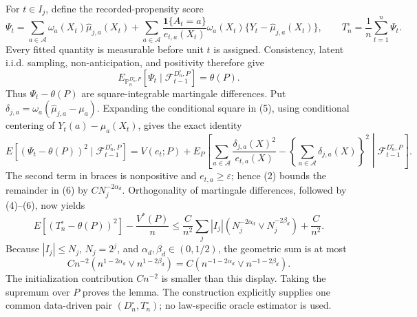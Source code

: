 For \(t\in I_j\), define the recorded-propensity score
\[
\Psi_t=
\sum_{a\in\mathcal A}\omega_a(X_t)\widehat\mu_{j,a}(X_t)
+\sum_{a\in\mathcal A}
\frac{\mathbf 1\{A_t=a\}}{e_{t,a}(X_t)}
\omega_a(X_t)\{Y_t-\widehat\mu_{j,a}(X_t)\},
\qquad
T_n^{\circ}=\frac1n\sum_{t=1}^n\Psi_t.
\]
Every fitted quantity is measurable before unit \(t\) is assigned.  Consistency, latent i.i.d. sampling, non-anticipation, and positivity therefore give
\[
E_{\mathbb P_n^{D_n^{\circ},P}}[\Psi_t\mid\mathcal F_{t-1}^{D_n^{\circ},P}]=\theta(P).
\tag{5}
\]
Thus \(\Psi_t-\theta(P)\) are square-integrable martingale differences.  Put \(\delta_{j,a}=\omega_a(\widehat\mu_{j,a}-\mu_a)\).  Expanding the conditional square in (5), using conditional centering of \(Y_t(a)-\mu_a(X_t)\), gives the exact identity
\[
E[(\Psi_t-\theta(P))^2\mid\mathcal F_{t-1}^{D_n^{\circ},P}]
=V(e_t;P)
+E_P\!\left[
\sum_{a\in\mathcal A}\frac{\delta_{j,a}(X)^2}{e_{t,a}(X)}
-\left\{\sum_{a\in\mathcal A}\delta_{j,a}(X)\right\}^2
\middle|\mathcal F_{t-1}^{D_n^{\circ},P}
\right].
\tag{6}
\]
The second term in braces is nonpositive and \(e_{t,a}\geq\varepsilon\); hence (2) bounds the remainder in (6) by \(CN_j^{-2\alpha_d}\).  Orthogonality of martingale differences, followed by (4)--(6), now yields
\[
E[(T_n^{\circ}-\theta(P))^2]-\frac{V^*(P)}n
\leq \frac{C}{n^2}\sum_j |I_j|
\left(N_j^{-2\alpha_d}\vee N_j^{-2\beta_d}\right)+\frac{C}{n^2}.
\]
Because \(|I_j|\leq N_j\), \(N_j=2^j\), and \(\alpha_d,\beta_d\in(0,1/2)\), the geometric sum is at most
\[
C n^{-2}\left(n^{1-2\alpha_d}\vee n^{1-2\beta_d}\right)
=C\left(n^{-1-2\alpha_d}\vee n^{-1-2\beta_d}\right).
\]
The initialization contribution \(Cn^{-2}\) is smaller than this display.  Taking the supremum over \(P\) proves the lemma.  The construction explicitly supplies one common data-driven pair \((D_n^{\circ},T_n^{\circ})\); no law-specific oracle estimator is used.